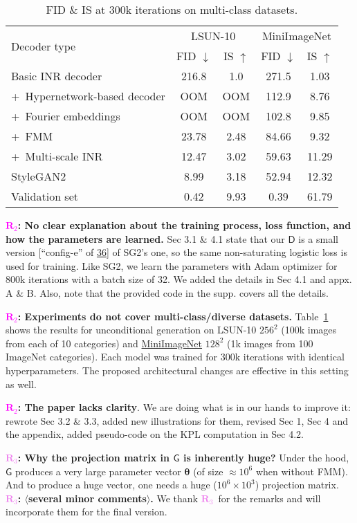 \documentclass[rebuttal]{cvpr}
\newcommand{\D}{\mathsf{D}}
\newcommand{\G}{\mathsf{G}}
\newcommand{\ReviewerB}{\textcolor{magenta}{$\bm R_2$}}
\newcommand{\ReviewerC}{\textcolor{violet}{$\bm R_3$}}
\newcommand{\ReviewerBsays}[1]{\textbf{\ReviewerB: \textbf{#1}}}
\newcommand{\ReviewerCsays}[1]{\textbf{\ReviewerC: \textbf{#1}}}
\begin{document}
\begin{table}
\caption{FID \& IS at 300k iterations on multi-class datasets.}
\label{table:diverse-datasets}
\centering
\begin{tabular}{|l|cc|cc|}
\hline
\multirow{2}{*}{Decoder type} & \multicolumn{2}{c|}{LSUN-10} & \multicolumn{2}{c|}{MiniImageNet} \\
& FID $\downarrow$ & IS $\uparrow$ & FID $\downarrow$ & IS $\uparrow$ \\
\hline
Basic INR decoder & 216.8 & 1.0 & 271.5 & 1.03 \\
+~Hypernetwork-based decoder & OOM & OOM & 112.9 & 8.76 \\
+~Fourier embeddings & OOM & OOM & 102.8 & 9.85 \\
+~FMM & 23.78 & 2.48 & 84.66 & 9.32 \\
+~Multi-scale INR & 12.47 & 3.02 & 59.63 & 11.29 \\
\hline
StyleGAN2 & 8.99 & 3.18 & 52.94 & 12.32 \\
\hline
Validation set & 0.42 & 9.93 & 0.39 & 61.79 \\
\hline
\end{tabular}
\end{table}
 
\ReviewerBsays{No clear explanation about the training process, loss function, and how the parameters are learned.} Sec 3.1 \& 4.1 state that our $\D$ is a small version [``config-e'' of \href{https://arxiv.org/abs/1912.04958}{36}] of SG2's one, so the same non-saturating logistic loss is used for training.
Like SG2, we learn the parameters with Adam optimizer for 800k iterations with a batch size of 32.
We added the details in Sec 4.1 and appx. A \& B.
Also, note that the provided code in the supp. covers all the details.


\ReviewerBsays{Experiments do not cover multi-class/diverse datasets.}
Table~\ref{table:diverse-datasets} shows the results for unconditional generation on LSUN-10 $256^2$ (100k images from each of 10 categories) and \href{https://github.com/yaoyao-liu/mini-imagenet-tools}{MiniImageNet} $128^2$ (1k images from 100 ImageNet categories).
Each model was trained for 300k iterations with identical hyperparameters.
The proposed architectural changes are effective in this setting as well.

\ReviewerBsays{The paper lacks clarity}.
We are doing what is in our hands to improve it: rewrote Sec 3.2 \& 3.3, added new illustrations for them, revised Sec 1, Sec 4 and the appendix, added pseudo-code on the KPL computation in Sec 4.2.

\ReviewerCsays{Why the projection matrix in $\G$ is inherently huge?}
Under the hood, $\G$ produces a very large parameter vector $\bm\theta$ (of size ${\approx}10^6$ when without FMM).
And to produce a huge vector, one needs a huge ($10^6 \times 10^3$) projection matrix. \ReviewerCsays{$\langle$several minor comments$\rangle$.} We thank \ReviewerC\ for the remarks and will incorporate them for the final version.
\end{document}
